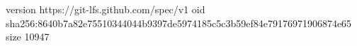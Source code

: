 version https://git-lfs.github.com/spec/v1
oid sha256:8640b7a82e75510344044b9397de5974185c5c3b59ef84e79176971906874e65
size 10947
